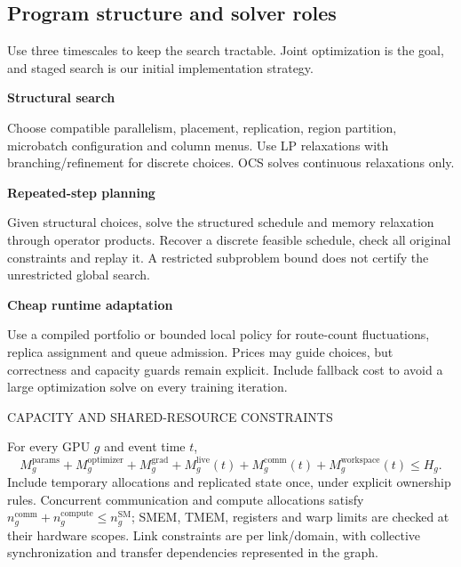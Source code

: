 \documentclass[10pt]{article}
\newcommand{\mono}{\ttfamily}
\newcommand{\lede}[1]{{\color{ink2}#1\par}\vspace{2pt}}
\newcommand{\ct}[1]{{\mono\fontsize{7.2}{8}\selectfont\color{ink2}\MakeUppercase{#1}}\par\vspace{2pt}}
\newcommand{\qa}[2]{%
\begin{card}
  {\sffamily\bfseries\fontsize{10.3}{12.5}\selectfont #1}\par\vspace{3pt}
  {\color{ink2}\fontsize{9}{11.6}\selectfont #2\par}
\end{card}\vspace{3pt}}
\begin{document}
\clearpage
\subsection{Program structure and solver roles}
\lede{Use three timescales to keep the search tractable. Joint optimization is
the goal, and staged search is our initial implementation strategy.}
\qa{Structural search}{Choose compatible parallelism, placement,
replication, region partition, microbatch configuration and column menus.
Use LP relaxations with branching/refinement for discrete choices. OCS solves
continuous relaxations only.}
\qa{Repeated-step planning}{Given structural choices, solve the structured
schedule and memory relaxation through operator products. Recover a discrete
feasible schedule, check all original constraints and replay it. A restricted
subproblem bound does not certify the unrestricted global search.}
\qa{Cheap runtime adaptation}{Use a compiled portfolio or bounded local policy
for route-count fluctuations, replica assignment and queue admission. Prices
may guide choices, but correctness and capacity guards remain explicit. Include
fallback cost to avoid a large optimization solve on every training iteration.}

\begin{card}
\ct{Capacity and shared-resource constraints}
For every GPU $g$ and event time $t$,
\[
 M_g^{\mathrm{params}}+M_g^{\mathrm{optimizer}}+M_g^{\mathrm{grad}}
 +M_g^{\mathrm{live}}(t)+M_g^{\mathrm{comm}}(t)
 +M_g^{\mathrm{workspace}}(t)\le H_g.
\]
Include temporary allocations and replicated state once, under explicit
ownership rules. Concurrent communication and compute allocations satisfy
$n_g^{\mathrm{comm}}+n_g^{\mathrm{compute}}\le n_g^{\mathrm{SM}}$;
SMEM, TMEM, registers and warp limits are checked at their hardware scopes.
Link constraints are per link/domain, with collective synchronization and
transfer dependencies represented in the graph.
\end{card}
\end{document}
